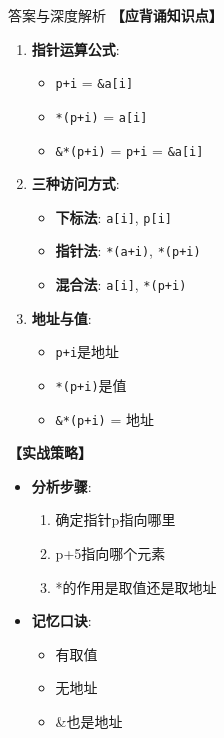 \documentclass[a4paper,12pt]{article}
\begin{document}
\begin{bluebox}{答案与深度解析}
	\textbf{【应背诵知识点】}

	\begin{enumerate}[leftmargin=*, nosep]
		\item \textbf{指针运算公式}:
		      \begin{itemize}
			      \item \texttt{p+i} = \texttt{\&a[i]}
			      \item \texttt{*(p+i)} = \texttt{a[i]}
			      \item \texttt{\&*(p+i)} = \texttt{p+i} = \texttt{\&a[i]}
		      \end{itemize}

		\item \textbf{三种访问方式}:
		      \begin{itemize}
			      \item \textbf{下标法}: \texttt{a[i]}, \texttt{p[i]}
			      \item \textbf{指针法}: \texttt{*(a+i)}, \texttt{*(p+i)}
			      \item \textbf{混合法}: \texttt{a[i]}, \texttt{*(p+i)}
		      \end{itemize}

		\item \textbf{地址与值}:
		      \begin{itemize}
			      \item \texttt{p+i}是地址
			      \item \texttt{*(p+i)}是值
			      \item \texttt{\&*(p+i)} = 地址
		      \end{itemize}
	\end{enumerate}

	\textbf{【实战策略】}
	\begin{itemize}[leftmargin=*, nosep]
		\item \textbf{分析步骤}:
		      \begin{enumerate}
			      \item 确定指针p指向哪里
			      \item p+5指向哪个元素
			      \item *的作用是取值还是取地址
		      \end{enumerate}

		\item \textbf{记忆口诀}:
		      \begin{itemize}
			      \item 有\*取值
			      \item 无\*地址
			      \item \&也是地址
		      \end{itemize}
	\end{itemize}
\end{bluebox}
\end{document}
